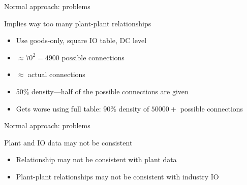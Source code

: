 \documentclass[12pt]{beamer}
\begin{document}
\begin{frame}{Normal approach: problems}

\begin{block}{Implies way too many plant-plant relationships}
\begin{itemize}
\item Use goods-only, square IO table, DC level
\item $\approx 70^2 = 4900$ possible connections
\item $\approx $ actual connections
\item 50\% density---half of the possible connections are given
\item Gets worse using full table: 90\% density of $50000+$ possible connections
\end{itemize}
\end{block}





\end{frame}

\begin{frame}{Normal approach: problems}


\begin{block}{Plant and IO data may not be consistent}
\begin{itemize}
\item Relationship may not be consistent with plant data %
\item Plant-plant relationships may not be consistent with industry IO
\end{itemize}
\end{block}
\end{frame}
\end{document}
